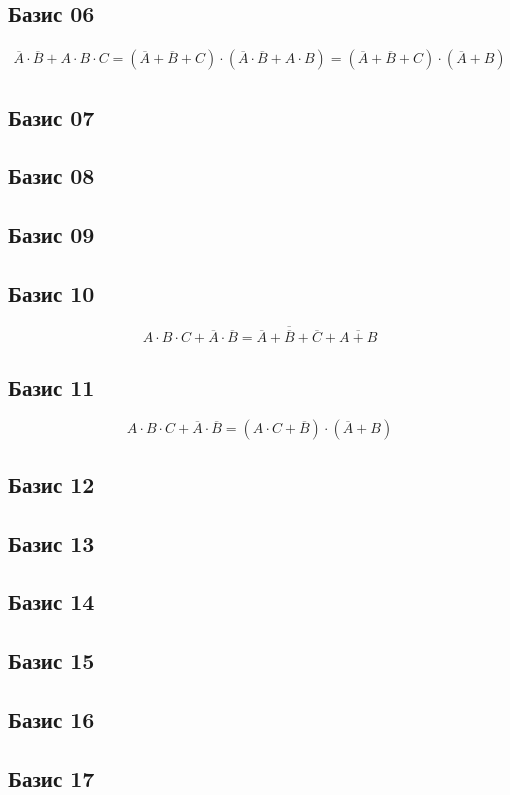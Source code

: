 \documentclass[a4paper,10pt]{article} %
\begin{document}
	\subsection{Базис 06}
	\begin{multline*}
	\overline{A} \cdot \overline{B} + A \cdot B \cdot C = 
	(\overline{A} + \overline{B} + C) 
	\cdot (\overline{A} \cdot \overline{B} + A \cdot B) =
	(\overline{A} + \overline{B} + C) 
	\cdot (\overline{A} + B
	)
	\end{multline*}
	
	\subsection{Базис 07}
	
	\subsection{Базис 08}
	
	\subsection{Базис 09}
	
	\subsection{Базис 10}
	
	\begin{equation}
		A \cdot B \cdot C + \overline{A} \cdot \overline{B} =
		\overline{\overline{A} + \overline{B} + \overline{C}} + \overline{A + B}
	\end{equation}
	
	\subsection{Базис 11}
	
	\begin{equation}
		A \cdot B \cdot C + \overline{A} \cdot \overline{B} = 
		(A \cdot C + \overline{B}) \cdot (\overline{A} + B)
	\end{equation}
	
	\subsection{Базис 12}
	
	\subsection{Базис 13}
	
	\subsection{Базис 14}
	
	\subsection{Базис 15}
	
	\subsection{Базис 16}
	
	\subsection{Базис 17}
\end{document}

